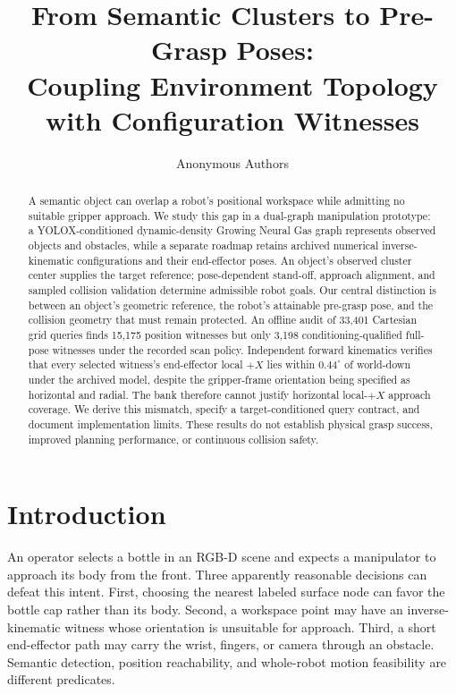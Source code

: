 \documentclass[letterpaper,10pt,conference]{ieeeconf}
\title{\LARGE\bf From Semantic Clusters to Pre-Grasp Poses:\\
Coupling Environment Topology with Configuration Witnesses}
\author{Anonymous Authors}
\begin{document}
\maketitle
\thispagestyle{empty}\pagestyle{empty}

\begin{abstract}
A semantic object can overlap a robot's positional workspace while admitting no suitable gripper approach. We study this gap in a dual-graph manipulation prototype: a YOLOX-conditioned dynamic-density Growing Neural Gas graph represents observed objects and obstacles, while a separate roadmap retains archived numerical inverse-kinematic configurations and their end-effector poses. An object's observed cluster center supplies the target reference; pose-dependent stand-off, approach alignment, and sampled collision validation determine admissible robot goals. Our central distinction is between an object's geometric reference, the robot's attainable pre-grasp pose, and the collision geometry that must remain protected. An offline audit of 33,401 Cartesian grid queries finds 15,175 position witnesses but only 3,198 conditioning-qualified full-pose witnesses under the recorded scan policy. Independent forward kinematics verifies that every selected witness's end-effector local $+X$ lies within $0.44^\circ$ of world-down under the archived model, despite the gripper-frame orientation being specified as horizontal and radial. The bank therefore cannot justify horizontal local-$+X$ approach coverage. We derive this mismatch, specify a target-conditioned query contract, and document implementation limits. These results do not establish physical grasp success, improved planning performance, or continuous collision safety.
\end{abstract}

\section{Introduction}
An operator selects a bottle in an RGB-D scene and expects a manipulator to approach its body from the front. Three apparently reasonable decisions can defeat this intent. First, choosing the nearest labeled surface node can favor the bottle cap rather than its body. Second, a workspace point may have an inverse-kinematic witness whose orientation is unsuitable for approach. Third, a short end-effector path may carry the wrist, fingers, or camera through an obstacle. Semantic detection, position reachability, and whole-robot motion feasibility are different predicates.
\end{document}
